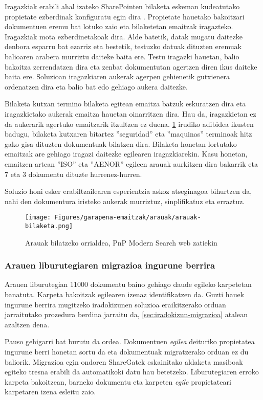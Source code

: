 Iragazkiak erabili ahal izateko SharePointen bilaketa eskeman kudeatutako propietate ezberdinak konfiguratu egin dira \cite{manage-search-schema}. Propietate hauetako bakoitzari dokumentuen eremu bat lotuko zaio eta 
bilaketetan emaitzak iragazteko. Iragazkiak mota ezberdinetakoak dira. Alde batetik, datak mugatu daitezke denbora esparru bat ezarriz eta bestetik, testuzko datuak dituzten eremuak balioaren arabera
murriztu daiteke baita ere. Testu iragazki hauetan, balio bakoitza zerrendatzen dira eta zenbat dokumentutan agertzen diren ikus daiteke baita ere. Soluzioan iragazkiaren aukerak agerpen gehienetik gutxienera ordenatzen dira eta balio bat edo gehiago aukera daitezke.

Bilaketa kutxan termino bilaketa egitean emaitza batzuk eskuratzen dira eta iragazkietako aukerak emaitza hauetan oinarritzen dira. Hau da, iragazkietan ez da aukerarik agertuko emaitzarik itzultzen ez duena. \ref{arauak-bilaketa} irudiko adibidea ikusten badugu, bilaketa kutxaren bitartez ''seguridad'' eta ''maquinas'' terminoak hitz gako gisa dituzten dokumentuak bilatzen dira. Bilaketa honetan lortutako emaitzak are gehiago iragazi daitezke egilearen iragazkiarekin. Kasu honetan, emaitzen artean ''ISO'' eta ''AENOR'' egileen arauak aurkitzen dira bakarrik eta 7 eta 3 dokumentu dituzte hurrenez-hurren.

Soluzio honi esker erabiltzailearen esperientzia askoz atseginagoa bihurtzen da, nahi den dokumentura iristeko aukerak murriztuz, sinplifikatuz eta erraztuz.

\begin{figure}[H]
\centering
\texttt{[image: Figures/garapena-emaitzak/arauak/arauak-bilaketa.png]}
\caption{Arauak bilatzeko orrialdea, PnP Modern Search web zatiekin}
\label{arauak-bilaketa}
\end{figure}

\subsubsection{Arauen liburutegiaren migrazioa ingurune berrira}
Arauen liburutegian 11000 dokumentu baino gehiago daude egileko karpetetan banatuta. Karpeta bakoitzak egilearen izenaz identifikatzen da. Guzti hauek ingurune berrira mugitzeko iradokizunen soluzioa eraikitzerako orduan jarraitutako prozedura berdina jarraitu da, \ref{sec:iradokizun-migrazioa} atalean azaltzen dena. 

Pauso gehigarri bat burutu da ordea. Dokumentuen \textit{egilea} deituriko propietatea ingurune berri honetan sortu da eta dokumentuak migratzerako orduan ez du baliorik. Migrazioa egin ondoren ShareGatek eskainitako aldaketa masiboak egiteko tresna erabili da automatikoki datu hau betetzeko. Liburutegiaren erroko karpeta bakoitzean, barneko dokumentu eta karpeten \textit{egile} propietateari karpetaren izena esleitu zaio.


